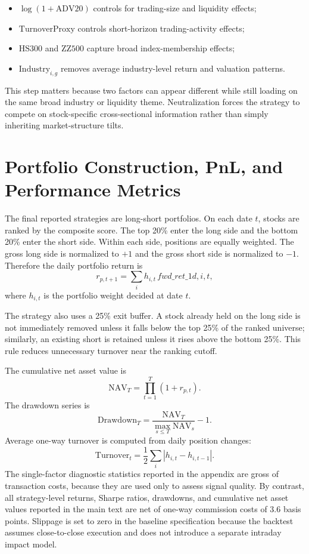\documentclass[11pt]{article}
\begin{document}
\begin{itemize}
    \item \(\log(1+\text{ADV20})\) controls for trading-size and liquidity effects;
    \item \(\text{TurnoverProxy}\) controls short-horizon trading-activity effects;
    \item \(\text{HS300}\) and \(\text{ZZ500}\) capture broad index-membership effects;
    \item \(\text{Industry}_{i,g}\) removes average industry-level return and valuation patterns.
\end{itemize}

This step matters because two factors can appear different while still loading on the same broad industry or liquidity theme. Neutralization forces the strategy to compete on stock-specific cross-sectional information rather than simply inheriting market-structure tilts.

\section{Portfolio Construction, PnL, and Performance Metrics}

The final reported strategies are long-short portfolios. On each date \(t\), stocks are ranked by the composite score. The top 20\% enter the long side and the bottom 20\% enter the short side. Within each side, positions are equally weighted. The gross long side is normalized to \(+1\) and the gross short side is normalized to \(-1\). Therefore the daily portfolio return is
\[
r_{p,t+1}=\sum_i h_{i,t}\,fwd\_ret\_{1d,i,t},
\]
where \(h_{i,t}\) is the portfolio weight decided at date \(t\).

The strategy also uses a 25\% exit buffer. A stock already held on the long side is not immediately removed unless it falls below the top 25\% of the ranked universe; similarly, an existing short is retained unless it rises above the bottom 25\%. This rule reduces unnecessary turnover near the ranking cutoff.

The cumulative net asset value is
\[
\text{NAV}_T=\prod_{t=1}^{T}(1+r_{p,t}).
\]
The drawdown series is
\[
\text{Drawdown}_T
=
\frac{\text{NAV}_T}{\max_{s \le T}\text{NAV}_s}-1.
\]
Average one-way turnover is computed from daily position changes:
\[
\text{Turnover}_t=\frac{1}{2}\sum_i |h_{i,t}-h_{i,t-1}|.
\]
The single-factor diagnostic statistics reported in the appendix are gross of transaction costs, because they are used only to assess signal quality. By contrast, all strategy-level returns, Sharpe ratios, drawdowns, and cumulative net asset values reported in the main text are net of one-way commission costs of 3.6 basis points. Slippage is set to zero in the baseline specification because the backtest assumes close-to-close execution and does not introduce a separate intraday impact model.
\end{document}

